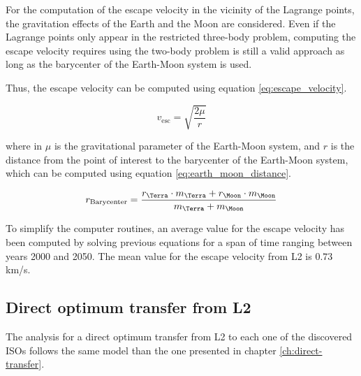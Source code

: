 For the computation of the escape velocity in the vicinity of the Lagrange
points, the gravitation effects of the Earth and the Moon are considered. Even
if the Lagrange points only appear in the restricted three-body problem,
computing the escape velocity requires using the two-body problem is still a
valid approach as long as the barycenter of the Earth-Moon system is used.

Thus, the escape velocity can be computed using equation \ref{eq:escape_velocity}.

\begin{equation}
        v_{\text{esc}} = \sqrt{\frac{2 \mu}{r}}
\label{eq:escape_velocity}
\end{equation}

where in $\mu$ is the gravitational parameter of the Earth-Moon system, and $r$
is the distance from the point of interest to the barycenter of the Earth-Moon
system, which can be computed using equation \ref{eq:earth_moon_distance}.

\begin{equation}
    r_{\text{Barycenter}} = \frac{r_{\text{\Terra}} \cdot m_{\text{\Terra}}
        + r_{\text{\Moon}} \cdot m_{\text{\Moon}}}{m_{\text{\Terra}} +
        m_{\text{\Moon}}}
    \label{eq:earth_moon_distance}
\end{equation}

To simplify the computer routines, an average value for the escape velocity has
been computed by solving previous equations for a span of time ranging between
years 2000 and 2050. The mean value for the escape velocity from L2 is $0.73$
km/s.

\subsection{Direct optimum transfer from L2}

The analysis for a direct optimum transfer from L2 to each one of the discovered
ISOs follows the same model than the one presented in chapter
\ref{ch:direct-transfer}.






